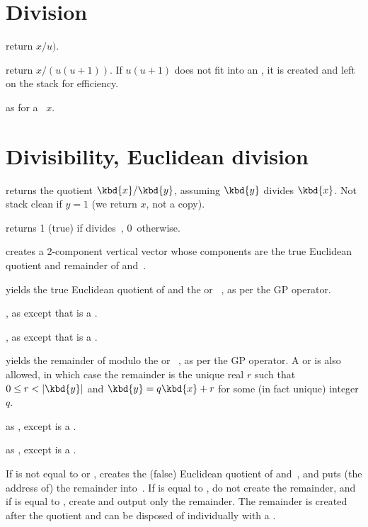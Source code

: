 \section{Division}

 return $x/u)$.

 return $x/(u(u+1))$. If $u(u+1)$
does not fit into an , it is created and left on the stack for efficiency.

 as  for a
~$x$.

\section{Divisibility, Euclidean division}

 returns the quotient $\kbd{x} / \kbd{y}$,
assuming $\kbd{y}$ divides $\kbd{x}$. Not stack clean if $y = 1$
(we return $x$, not a copy).

  returns 1 (true) if  divides~,
0~otherwise.

 creates a 2-component vertical
vector whose components are the true Euclidean quotient and remainder
of  and~.

 yields the true Euclidean
quotient of  and the  or ~, as per
the \kbd{\bs} GP operator.

, as 
except that  is a .

, as 
except that  is a .

 yields the remainder of 
modulo the  or ~, as per the \kbd{\%} GP operator.
A  or   is also allowed, in which case the
remainder is the unique real $r$ such that $0 \leq r < |\kbd{y}|$ and
$\kbd{y} = q\kbd{x} + r$ for some (in fact unique) integer $q$.

 as , except  is
a .

 as , except  is
a .

 If  is not equal to
 or , creates the (false) Euclidean quotient of
 and~, and puts (the address of) the remainder into~.
If  is equal to , do not create the remainder, and if
 is equal to , create and output only the remainder.
The remainder is created after the quotient and can be disposed of
individually with a .

